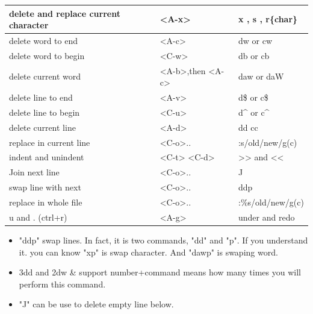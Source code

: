 \documentclass[a4paper,12pt,twoside]{book}
\begin{document}
\begin{itemize}
\begin{center}
\begin{tabular}{p{}|p{}|p{}}
	
		\hline 
		delete and replace current character & <A-x> & x , s , r\{char\}  \\
	
		\hline 
		delete word to end & <A-c> &dw or cw  \\
		
		\hline 
		delete word to begin & <C-w> &db or cb  \\

		\hline 
		delete current word &<A-b>,then <A-c> & daw or daW \\
		
		\hline 
		delete line to end & <A-v> & d\$ or c\$  \\
		
		\hline 
		delete line to begin & <C-u> & d\^{} or c\^{}  \\
		
		\hline 
		delete current line & <A-d> & dd cc \\

       \hline
	   replace in current line &<C-o>.. & :s/old/new/g(c) \\

	   \hline
		indent and unindent & <C-t> <C-d> & >> and << \\

	   \hline 
	   Join next line & <C-o>.. & J \\ 

	   \hline 
		swap line with next &<C-o>.. & ddp \\
	
		\hline 
	   replace in whole file &<C-o>.. & :\%s/old/new/g(c) \\

		\hline 
		u and . (ctrl+r)  & <A-g> & under and redo \\ 
		
				\end{tabular}
	\end{center}
	\begin{itemize}
			\item "ddp" swap lines. In fact, it is two commands, "dd" and "p". If you understand it. you can know "xp" is swap character. And "dawp" is swaping word.

			\item 3dd and 2dw   \& support number+command means how many times you will perform this command.
			\item "J" can be use to delete empty line below.
	\end{itemize}




\end{itemize}
\end{document}
